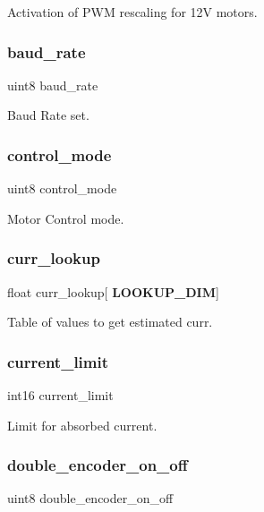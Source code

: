 Activation of P\+WM rescaling for 12V motors. \mbox{\label{structst__mem_a1a2b3002580421effeca67955a862580}} 
\subsubsection{baud\+\_\+rate}
{\footnotesize\ttfamily uint8 baud\+\_\+rate}

Baud Rate set. \mbox{\label{structst__mem_af0c55b7d870673f2f6e9521c215d4b51}} 
\subsubsection{control\+\_\+mode}
{\footnotesize\ttfamily uint8 control\+\_\+mode}

Motor Control mode. \mbox{\label{structst__mem_a29cec4cab946141aae2509b04e2f5097}} 
\subsubsection{curr\+\_\+lookup}
{\footnotesize\ttfamily float curr\+\_\+lookup[\textbf{ L\+O\+O\+K\+U\+P\+\_\+\+D\+IM}]}

Table of values to get estimated curr. \mbox{\label{structst__mem_a96f2aec80e40c1bbe82186a4261ab7ac}} 
\subsubsection{current\+\_\+limit}
{\footnotesize\ttfamily int16 current\+\_\+limit}

Limit for absorbed current. \mbox{\label{structst__mem_a3d5832272cab9dc9f831471a9634b43e}} 
\subsubsection{double\+\_\+encoder\+\_\+on\+\_\+off}
{\footnotesize\ttfamily uint8 double\+\_\+encoder\+\_\+on\+\_\+off}

